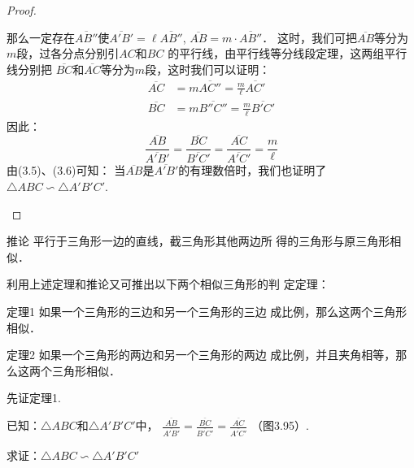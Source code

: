 \begin{proof}
\begin{enumerate}
那么一定存在$\overline{AB''}$使$\overline{A'B'}=\ell \overline{AB''}$, $\overline{AB}=m\cdot \overline{AB''}$．
这时，我们可把$\overline{AB}$等分为$m$段，过各分点分别引$AC$和$BC$
的平行线，由平行线等分线段定理，这两组平行线分别把
$\overline{BC}$和$\overline{AC}$等分为$m$段，这时我们可以证明：
\[\begin{split}
    \overline{AC}&=m\overline{AC''}=\frac{m}{\ell}\overline{AC'}\\
    \overline{BC}&=m\overline{B''C''}=\frac{m}{\ell}\overline{B'C'}
\end{split}\]
因此：
\begin{equation}
    \frac{\overline{AB}}{\overline{A'B'}}=\frac{\overline{BC}}{\overline{B'C'}}=\frac{\overline{AC}}{\overline{A'C'}}=\frac{m}{\ell}
\end{equation}
由(3.5)、(3.6)可知：
当$\overline{AB}$是$\overline{A'B'}$的有理数倍时，我们也证明了
$\triangle ABC\backsim \triangle A'B'C'$.
\end{enumerate}
\end{proof}

\begin{blk}
    {推论} 平行于三角形一边的直线，截三角形其他两边所
得的三角形与原三角形相似．
\end{blk}

利用上述定理和推论又可推出以下两个相似三角形的判
定定理：

\begin{blk}
    {定理1}
如果一个三角形的三边和另一个三角形的三边
成比例，那么这两个三角形相似．
\end{blk}

\begin{blk}
    {定理2}
如果一个三角形的两边和另一个三角形的两边
成比例，并且夹角相等，那么这两个三角形相似．
\end{blk}

先证定理1.

已知：$\triangle ABC$和$\triangle A'B'C'$中，
$\frac{\overline{AB}}{\overline{A'B'}}=\frac{\overline{BC}}{\overline{B'C'}}=\frac{\overline{AC}}{\overline{A'C'}}$
（图3.95）.

求证：$\triangle ABC\backsim \triangle A'B'C'$

\begin{figure}[htp]
    \centering
{}
    \caption{}
\end{figure}

